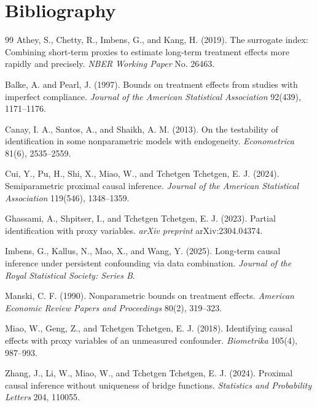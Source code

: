 \documentclass[11pt]{article}
\theoremstyle{definition}
\theoremstyle{plain}
\theoremstyle{remark}
\begin{document}
\section*{Bibliography}
\begin{thebibliography}{99}
Athey, S., Chetty, R., Imbens, G., and Kang, H. (2019).
\newblock The surrogate index: Combining short-term proxies to estimate
long-term treatment effects more rapidly and precisely.
\newblock \emph{NBER Working Paper} No. 26463.

Balke, A. and Pearl, J. (1997).
\newblock Bounds on treatment effects from studies with imperfect compliance.
\newblock \emph{Journal of the American Statistical Association} 92(439),
1171--1176.

Canay, I. A., Santos, A., and Shaikh, A. M. (2013).
\newblock On the testability of identification in some nonparametric models
with endogeneity.
\newblock \emph{Econometrica} 81(6), 2535--2559.

Cui, Y., Pu, H., Shi, X., Miao, W., and Tchetgen Tchetgen, E. J. (2024).
\newblock Semiparametric proximal causal inference.
\newblock \emph{Journal of the American Statistical Association} 119(546),
1348--1359.

Ghassami, A., Shpitser, I., and Tchetgen Tchetgen, E. J. (2023).
\newblock Partial identification with proxy variables.
\newblock \emph{arXiv preprint} arXiv:2304.04374.

Imbens, G., Kallus, N., Mao, X., and Wang, Y. (2025).
\newblock Long-term causal inference under persistent confounding via data
combination.
\newblock \emph{Journal of the Royal Statistical Society: Series B}.

Manski, C. F. (1990).
\newblock Nonparametric bounds on treatment effects.
\newblock \emph{American Economic Review Papers and Proceedings} 80(2),
319--323.

Miao, W., Geng, Z., and Tchetgen Tchetgen, E. J. (2018).
\newblock Identifying causal effects with proxy variables of an unmeasured
confounder.
\newblock \emph{Biometrika} 105(4), 987--993.

Zhang, J., Li, W., Miao, W., and Tchetgen Tchetgen, E. J. (2024).
\newblock Proximal causal inference without uniqueness of bridge functions.
\newblock \emph{Statistics and Probability Letters} 204, 110055.
\end{thebibliography}
\end{document}
